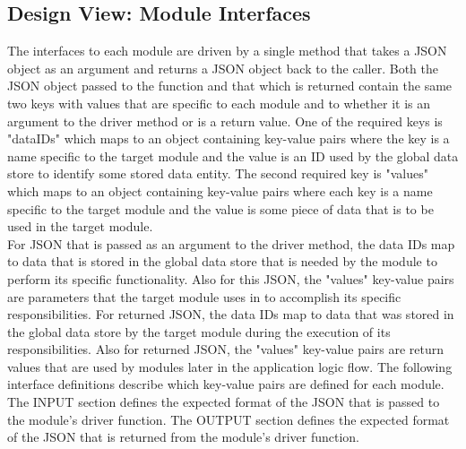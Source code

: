 \documentclass[onecolumn, draftclsnofoot,10pt, compsoc]{IEEEtran}
\begin{document}
    \subsection{Design View: Module Interfaces}
        The interfaces to each module are driven by a single method that takes a JSON object as an argument and returns a JSON object back to the caller.
        Both the JSON object passed to the function and that which is returned contain the same two keys with values that are specific to each module and to whether it is an argument to the driver method or is a return value.
        One of the required keys is "dataIDs" which maps to an object containing key-value pairs where the key is a name specific to the target module and the value is an ID used by the global data store to identify some stored data entity.
        The second required key is "values" which maps to an object containing key-value pairs where each key is a name specific to the target module and the value is some piece of data that is to be used in the target module.
        \\[0.1in]
        For JSON that is passed as an argument to the driver method, the data IDs map to data that is stored in the global data store that is needed by the module to perform its specific functionality. 
        Also for this JSON, the "values" key-value pairs are parameters that the target module uses in to accomplish its specific responsibilities.
        For returned JSON, the data IDs map to data that was stored in the global data store by the target module during the execution of its responsibilities.
        Also for returned JSON, the "values" key-value pairs are return values that are used by modules later in the application logic flow.
        The following interface definitions describe which key-value pairs are defined for each module. 
        \\[0.1in]
        The INPUT section defines the expected format of the JSON that is passed to the module's driver function.
        The OUTPUT section defines the expected format of the JSON that is returned from the module's driver function.
\end{document}
